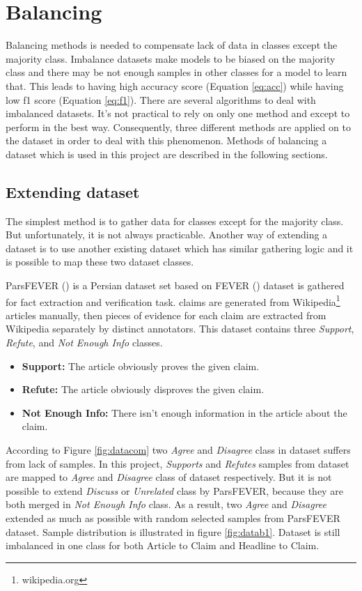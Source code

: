 \section{Balancing}
\label{mth:balance}
Balancing methods is needed to compensate lack of data in classes except the majority class. Imbalance datasets make models to be biased on the majority class and there may be not enough samples in other classes for a model to learn that. This leads to having high accuracy score (Equation \ref{eq:acc}) while having low f1 score (Equation \ref{eq:f1}). There are several algorithms to deal with imbalanced datasets. It's not practical to rely on only one method and except to perform in the best way. Consequently, three different methods are applied on to the dataset in order to deal with this phenomenon. Methods of balancing a dataset which is used in this project are described in the following sections.  
	
\subsection{Extending dataset}
The simplest method is to gather data for classes except for the majority class. But unfortunately, it is not always practicable. Another way of extending a dataset is to use another existing dataset which has similar gathering logic and it is possible to map these two dataset classes. 

ParsFEVER (\cite{parsfever}) is a Persian dataset set based on FEVER (\cite{fever}) dataset is gathered for fact extraction and verification task. \cite{parsfever} claims are generated from Wikipedia\footnote{wikipedia.org} articles manually, then pieces of evidence for each claim are extracted from Wikipedia separately by distinct annotators. This dataset contains three \textit{Support}, \textit{Refute}, and \textit{Not Enough Info} classes. 
\begin{itemize}
	\item {\color{green!70!black}\textbf{Support:}} The article obviously proves the given claim. 
	\item {\color{red!60!black}\textbf{Refute:}} The article obviously disproves the given claim.
	\item {\color{gray}\textbf{Not Enough Info:}} There isn't enough information in the article about the claim. 
\end{itemize}                

According to Figure \ref{fig:datacom} two \textit{Agree} and \textit{Disagree} class in \cite{stance_persian} dataset suffers from lack of samples. In this project, \textit{Supports} and \textit{Refutes} samples from \cite{parsfever} dataset are mapped to \textit{Agree} and \textit{Disagree} class of \cite{stance_persian} dataset respectively. 
But it is not possible to extend \textit{Discuss} or \textit{Unrelated} class by ParsFEVER, because they are both merged in \textit{Not Enough Info} class. As a result, two \textit{Agree} and \textit{Disagree} extended as much as possible with random selected samples from ParsFEVER dataset. Sample distribution is illustrated in figure \ref{fig:datab1}. Dataset is still imbalanced in one class for both Article to Claim and Headline to Claim.


